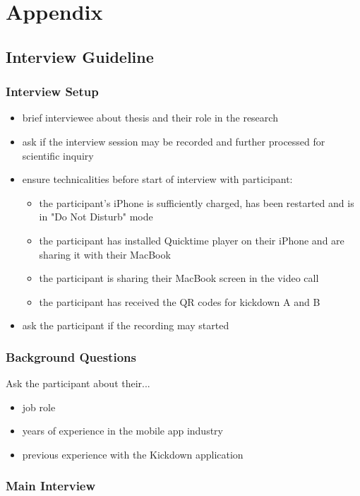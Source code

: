 \appendix
\chapter{Appendix}

\section{Interview Guideline}
\subsection{Interview Setup}
\begin{itemize}
    \item brief interviewee about thesis and their role in the research
    \item ask if the interview session may be recorded and further processed for scientific inquiry
    \item ensure technicalities before start of interview with participant:
    \begin{itemize}
        \item the participant's iPhone is sufficiently charged, has been restarted and is in "Do Not Disturb" mode
        \item the participant has installed Quicktime player on their iPhone and are sharing it with their MacBook
        \item the participant is sharing their MacBook screen in the video call
        \item the participant has received the QR codes for kickdown A and B
    \end{itemize}
    \item ask the participant if the recording may started
\end{itemize}

\subsection{Background Questions}
Ask the participant about their...
\begin{itemize}
    \item job role
    \item years of experience in the mobile app industry
    \item previous experience with the Kickdown application
\end{itemize}

\subsection{Main Interview}
